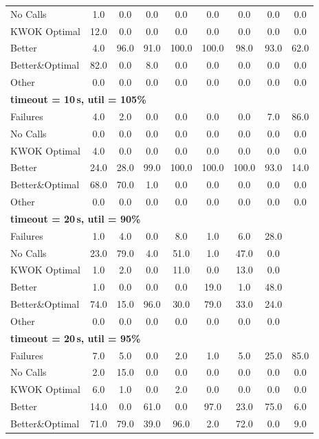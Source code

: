 \begin{tabular}{l cccccccc}
No Calls & 1.0 & 0.0 & 0.0 & 0.0 & 0.0 & 0.0 & 0.0 & 0.0 \\
KWOK Optimal & 12.0 & 0.0 & 0.0 & 0.0 & 0.0 & 0.0 & 0.0 & 0.0 \\
Better & 4.0 & 96.0 & 91.0 & 100.0 & 100.0 & 98.0 & 93.0 & 62.0 \\
Better\&Optimal & 82.0 & 0.0 & 8.0 & 0.0 & 0.0 & 0.0 & 0.0 & 0.0 \\
Other & 0.0 & 0.0 & 0.0 & 0.0 & 0.0 & 0.0 & 0.0 & 0.0 \\
\midrule
\multicolumn{9}{l}{\textbf{timeout = 10\,s, util = 105\%}} \\
\midrule
Failures & 4.0 & 2.0 & 0.0 & 0.0 & 0.0 & 0.0 & 7.0 & 86.0 \\
No Calls & 0.0 & 0.0 & 0.0 & 0.0 & 0.0 & 0.0 & 0.0 & 0.0 \\
KWOK Optimal & 4.0 & 0.0 & 0.0 & 0.0 & 0.0 & 0.0 & 0.0 & 0.0 \\
Better & 24.0 & 28.0 & 99.0 & 100.0 & 100.0 & 100.0 & 93.0 & 14.0 \\
Better\&Optimal & 68.0 & 70.0 & 1.0 & 0.0 & 0.0 & 0.0 & 0.0 & 0.0 \\
Other & 0.0 & 0.0 & 0.0 & 0.0 & 0.0 & 0.0 & 0.0 & 0.0 \\
\midrule
\multicolumn{9}{l}{\textbf{timeout = 20\,s, util = 90\%}} \\
\midrule
Failures & 1.0 & 4.0 & 0.0 & 8.0 & 1.0 & 6.0 & 28.0 & \text{--} \\
No Calls & 23.0 & 79.0 & 4.0 & 51.0 & 1.0 & 47.0 & 0.0 & \text{--} \\
KWOK Optimal & 1.0 & 2.0 & 0.0 & 11.0 & 0.0 & 13.0 & 0.0 & \text{--} \\
Better & 1.0 & 0.0 & 0.0 & 0.0 & 19.0 & 1.0 & 48.0 & \text{--} \\
Better\&Optimal & 74.0 & 15.0 & 96.0 & 30.0 & 79.0 & 33.0 & 24.0 & \text{--} \\
Other & 0.0 & 0.0 & 0.0 & 0.0 & 0.0 & 0.0 & 0.0 & \text{--} \\
\midrule
\multicolumn{9}{l}{\textbf{timeout = 20\,s, util = 95\%}} \\
\midrule
Failures & 7.0 & 5.0 & 0.0 & 2.0 & 1.0 & 5.0 & 25.0 & 85.0 \\
No Calls & 2.0 & 15.0 & 0.0 & 0.0 & 0.0 & 0.0 & 0.0 & 0.0 \\
KWOK Optimal & 6.0 & 1.0 & 0.0 & 2.0 & 0.0 & 0.0 & 0.0 & 0.0 \\
Better & 14.0 & 0.0 & 61.0 & 0.0 & 97.0 & 23.0 & 75.0 & 6.0 \\
Better\&Optimal & 71.0 & 79.0 & 39.0 & 96.0 & 2.0 & 72.0 & 0.0 & 9.0 \\

\end{tabular}
